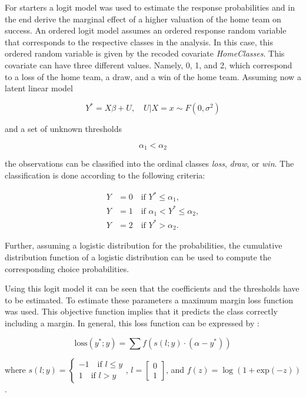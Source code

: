 \documentclass[11pt]{article}
\begin{document}
For starters a logit model was used to estimate the response probabilities and in the end derive the marginal effect of a higher valuation of the home team on success. An ordered logit model assumes an ordered response random variable that corresponds to the respective classes in the analysis. In this case, this ordered random variable is given by the recoded covariate \textit{HomeClasses}. This covariate can have three different values. Namely, 0, 1, and 2, which correspond to a loss of the home team, a draw, and a win of the home team. Assuming now a latent linear model

$$
Y^{*} = X\beta + U, \quad U | X = x \sim F(0, \sigma^2)
$$

and a set of unknown thresholds

$$
\alpha_1 < \alpha_2
$$

the observations can be classified into the ordinal classes \textit{loss}, \textit{draw}, or \textit{win}. The classification is done according to the following criteria:

\begin{align*}
	Y &= 0 \quad \text{if } Y^{*} \leqslant \alpha_1, \\
	Y &= 1 \quad \text{if } \alpha_1 < Y^{*} \leqslant \alpha_2, \\
	Y &= 2 \quad \text{if } Y^{*} > \alpha_2.
\end{align*}

Further, assuming a logistic distribution for the probabilities, the cumulative distribution function of a logistic distribution can be used to compute the corresponding choice probabilities. \cite[p. 36f]{lechner2021}

Using this logit model it can be seen that the coefficients and the thresholds have to be estimated. To estimate these parameters a maximum margin loss function was used. This objective function implies that it predicts the class correctly including a margin. In general, this loss function can be expressed by \cite{rennie2005}:

$$
\text{loss}(y^{*}; y) = \sum f \left(s(l; y) \cdot (\alpha - y^{*})\right)
$$

\vspace{12pt}

where $s(l; y) = \begin{cases}-1 \quad \text{if } l \leqslant y \\ 1 \quad \text{if } l > y\end{cases}$, $l = \begin{bmatrix}0 \\ 1\end{bmatrix}$, and $f(z) = \log(1 + \text{exp}(-z))$.
\end{document}
